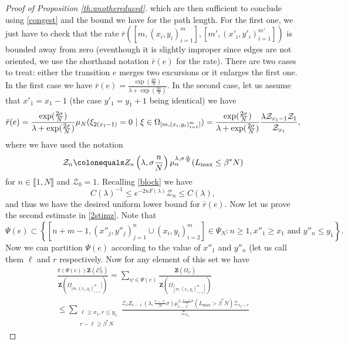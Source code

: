 \documentclass[reqno,11pt]{amsart}
\numberwithin{equation}{section}
\newcommand{\gb}{\beta}
\newcommand{\gO}{\Omega}
\newcommand{\gl}{\lambda}
\newcommand{\gs}{\sigma}
\newcommand{\cE}{{\ensuremath{\mathcal E}} }
\newcommand{\cZ}{{\ensuremath{\mathcal Z}} }
\newcommand{\bZ}{{\ensuremath{\mathbf Z}} }
\newcommand{\lint}{\llbracket}
\newcommand{\rint}{\rrbracket}
\newcommand{\sumtwo}[2]{\sum_{\substack{#1 \\ #2}}} %
\begin{document}
\begin{proof}[Proof of Proposition \ref{th:anothereduced}]
which are then sufficient to conclude using \eqref{congest} and the bound we have for the path length.
For the first one, we just have to check that the rate
$\bar r([m, (x_i,y_i)^m_{i=1}], [m', (x'_i,y'_i)^{m'}_{i=1}] )$ 
 is bounded away from zero (eventhough it is slightly improper since edges are not oriented, we use the shorthand notation $\bar r(e)$ for the rate).
 There are two cases to treat: either the transition $e$ merges two excursions or it enlarges the first one. In the first case we have $\bar r(e)= \frac{\exp(\frac{2\gs}{N})}{\gl+ \exp(\frac{2\gs}{N})}$.
 In the second case, let us assume that $x'_1=x_1-1$ (the case $y'_1=y_1+1$ being identical) we have 
 \begin{equation}
  \bar r(e)= \frac{\exp(\frac{2\gs}{N})}{\gl+ \exp(\frac{2\gs}{N})}
\mu_{N}(\xi_{2(x_1-1)}=0 \ | \ \xi\in \gO_{[m, (x_i,y_i)^m_{i=1}]} )
 \\
 =\frac{\exp(\frac{2\gs}{N})}{\gl+ \exp(\frac{2\gs}{N})} \frac{\gl  \cZ_{x_1-1}\cZ_1}{\cZ_{x_1}},
 \end{equation}
where
we have used the notation
\begin{equation}\label{onemoreZ}
\cZ_n \colonequals Z_n\left(\gl, \gs \frac{n}{N}\right) \mu_{n}^{\gl, \gs\frac{n}{N}}(L_{\max}\le \gb^*N)
\end{equation}
 for  $n \in \lint 1,  N \rint$ and $\cZ_0=1$.
Recalling \eqref{block} we have
 \begin{equation}\label{deformE1}
C(\gl)^{-1} \le   e^{-2n F(\gl)} \cZ_n\le C(\gl),
 \end{equation}
 and thus we have the desired uniform lower bound for $\bar r (e)$.
 Now let us prove the second estimate in \eqref{2stimz}.
 Note that 
 \begin{equation}
  \Psi(e) \subset\left\{ [n+m-1, (x''_j, y''_j)_{j=1}^n \cup (x_i,y_i)_{i=2}^m] \in \Psi_N: n\ge 1,  x''_1\ge  x_1 \text{ and }   y''_n\le y_1  \right \}.
 \end{equation}
Now we can partition $\Psi(e)$ according to the value of $x''_1$ and $y''_n$ (let us call them $\ell$ and $r$ respectively.
Now for any element of this set we have
 \begin{multline}\label{elemratio}
 \frac{ \bar \pi \left(\Psi(e)\right) \bZ(\cE_N^2)}{\bZ(\gO_{[m, (x_i,y_i)^m_{i=1}}])} =  \sum_{\psi\in \Psi(e)} \frac{\bZ(\gO_{\psi})}{\bZ(\gO_{[m, (x_i, y_i)_{i=1}^m]})}\\
 \le \sumtwo{\ell \ge x_1, r\le y_1}{r-\ell \ge \beta^* N}\frac{\cZ_{\ell} 
 Z_{r-\ell}\left(\gl, \frac{r-\ell}{N} \gs\right) \mu_{r-\ell}^{\gl, \frac{r-\ell}{N}\gs} \left( L_{\max} > \gb^*N \right) \cZ_{x_2-r} }{ \cZ_{x_1} 
}
\end{multline}
\end{proof}
\end{document}
